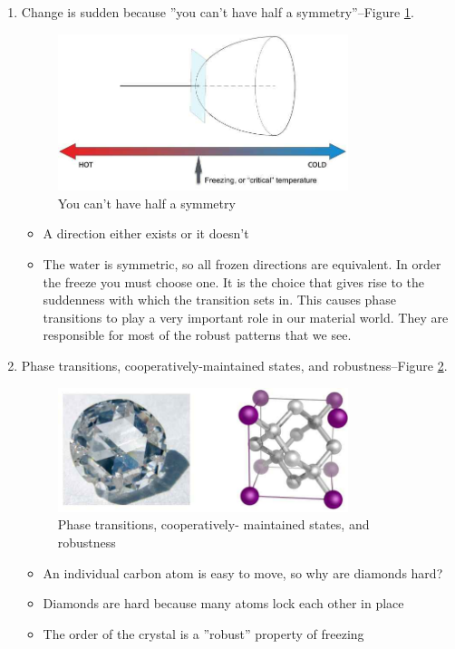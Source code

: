 \documentclass[]{article}
\begin{document}
\begin{enumerate}
	\item Change is sudden because ''you can’t have half a symmetry''--Figure \ref{fig:water-ice3}.
	\begin{figure}[H]
		\begin{center}
			\caption{You can’t have half a symmetry}\label{fig:water-ice3}
			\includegraphics[width=0.8\textwidth]{water-ice3}
		\end{center}
	\end{figure}
	\begin{itemize}
		\item A direction either exists or it doesn’t
		\item The water is symmetric, so all frozen directions are equivalent. In order the freeze you must choose one. It is the choice that gives rise to the suddenness with which the transition sets in. This causes phase transitions to play a very important role in our material world. They are responsible for most of the robust patterns that we see.
	\end{itemize}
	\item Phase transitions, cooperatively-maintained states, and robustness--Figure \ref{fig:a-girls-best-friend}.
	\begin{figure}[H]
		\begin{center}
			\caption{Phase transitions, cooperatively-
				maintained states, and robustness}\label{fig:a-girls-best-friend}
			\includegraphics[width=0.8\textwidth]{a-girls-best-friend}
		\end{center}
	\end{figure}
	\begin{itemize}
		\item An individual carbon atom is easy to move, so why are diamonds hard?
		\item Diamonds are hard because many atoms lock each other in place
		\item The order of the crystal is a ''robust'' property of freezing
	\end{itemize}
\end{enumerate}
\end{document}
